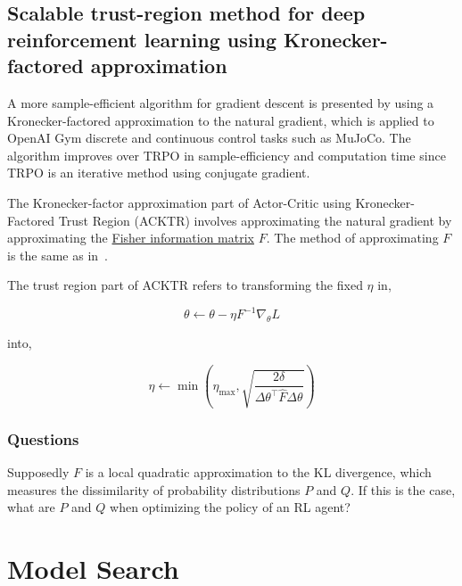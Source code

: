 \documentclass[a4paper, 12pt]{article}
\begin{document}
\subsection{Scalable trust-region method for deep reinforcement learning using
            Kronecker-factored
            approximation~\citet{DBLP:journals/corr/abs-1708-05144}}

A more sample-efficient algorithm for gradient descent is presented by using a
Kronecker-factored approximation to the natural gradient, which is applied to
OpenAI Gym discrete and continuous control tasks such as MuJoCo. The algorithm
improves over TRPO in sample-efficiency and computation time since TRPO is an
iterative method using conjugate gradient.

The Kronecker-factor approximation part of Actor-Critic using
Kronecker-Factored Trust Region (ACKTR) involves approximating the natural
gradient by approximating the
\hyperref[fisher-info]{Fisher information matrix} $F$. The method of
approximating $F$ is the same as in~\citet{DBLP:journals/corr/MartensG15}.

The trust region part of ACKTR refers to transforming the fixed $\eta$ in,

\begin{equation*}
        \theta \leftarrow \theta - \eta F^{-1} \nabla_\theta L
\end{equation*}

into,

\begin{equation*}
        \eta \leftarrow \min\left(
                \eta_{\max}, \sqrt{
                        \frac{2\delta}{\Delta\theta^{\top}
                                       \hat{F}
                                       \Delta\theta}}\right)
\end{equation*}

\subsubsection{Questions}

Supposedly $F$ is a local quadratic approximation to the KL divergence, which
measures the dissimilarity of probability distributions $P$ and $Q$. If this is
the case, what are $P$ and $Q$ when optimizing the policy of an RL agent?


\section{Model Search}
\end{document}
